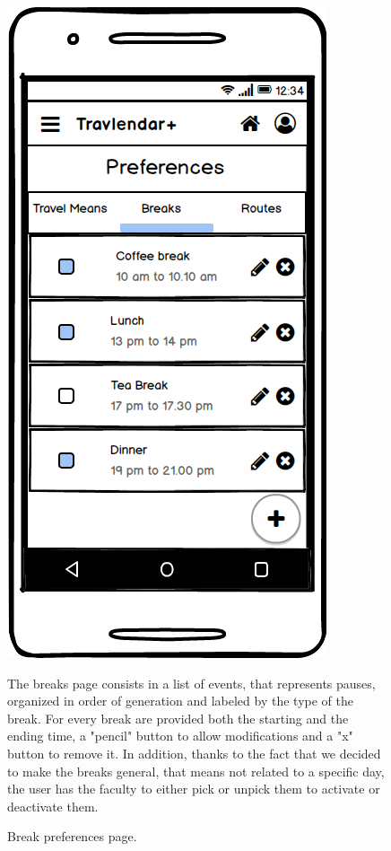 \documentclass[11pt]{article}
\begin{document}
		\begin{figure}
		\centering
		\includegraphics[width=0.7\linewidth]{PreferencesBreaks.png}
		\caption{Break preferences page.}
		\label{fig:preferencesbreaks}
		\begin{center}
			The breaks page consists in a list of events, that represents pauses, organized in order of generation and labeled by the type of the break. For every break are provided both the starting and the ending time, a "pencil" button to allow modifications and a "x" button to remove it. In addition, thanks to the fact that we decided to make the breaks general, that means not related to a specific day, the user has the faculty to either pick or unpick them to activate or deactivate them. 
		\end{center}
		\begin{center}
			
		\end{center}
	\end{figure}
	
\end{document}
